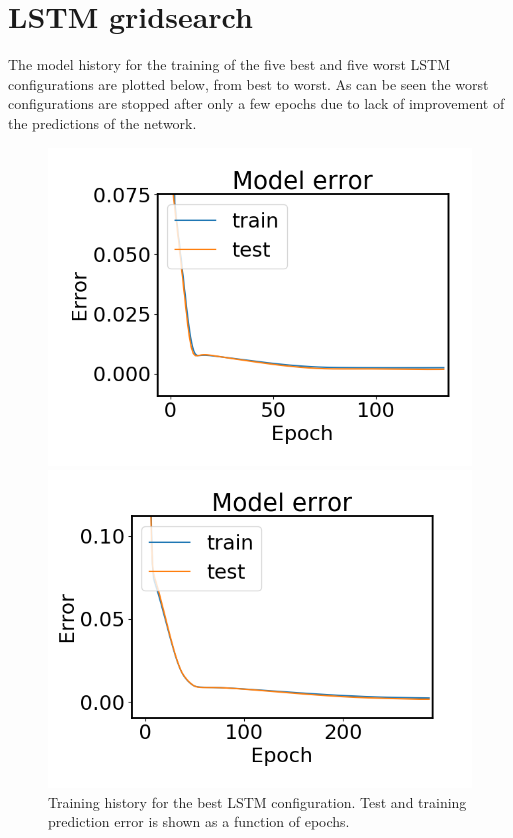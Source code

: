 \chapter{LSTM gridsearch}\label{appendix:lstm_grid}
    The model history for the training of the five best and five worst LSTM configurations are plotted below, from best to worst. As can be seen the worst configurations are stopped after only a few epochs due to lack of improvement of the predictions of the network. 
    \begin{figure}
        \begin{minipage}[b]{0.49\linewidth}
            \centering
            \includegraphics[width = \textwidth]{report/figures/analysis/lstm_gridsearch/best_lstm_error_zoomed.png}
            \caption{Training history for the best LSTM configuration. Test and training prediction error is shown as a function of epochs.}
        \end{minipage}
        \hfill\vline\hfill
        \begin{minipage}[b]{0.49\linewidth}
            \centering
            \includegraphics[width = \textwidth]{report/figures/analysis/lstm_gridsearch/best_lstm_error_2_zoomed.png}

\end{minipage}
\end{figure}
